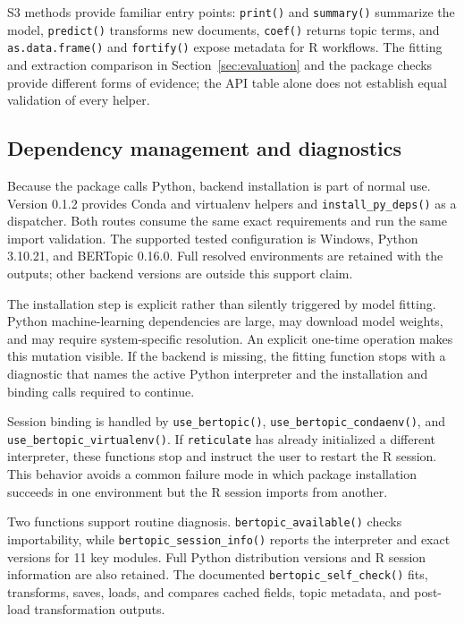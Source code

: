 \documentclass[12pt]{article}
\newcommand{\pkg}[1]{\texttt{#1}}
\newcommand{\code}[1]{\texttt{#1}}
\begin{document}
S3 methods provide familiar entry points: \code{print()} and \code{summary()} summarize the model, \code{predict()} transforms new documents, \code{coef()} returns topic terms, and \code{as.data.frame()} and \code{fortify()} expose metadata for R workflows. The fitting and extraction comparison in Section~\ref{sec:evaluation} and the package checks provide different forms of evidence; the API table alone does not establish equal validation of every helper.

\subsection{Dependency management and diagnostics}

Because the package calls Python, backend installation is part of normal use. Version 0.1.2 provides Conda and virtualenv helpers and \code{install\_py\_deps()} as a dispatcher. Both routes consume the same exact requirements and run the same import validation. The supported tested configuration is Windows, Python 3.10.21, and BERTopic 0.16.0. Full resolved environments are retained with the outputs; other backend versions are outside this support claim.

The installation step is explicit rather than silently triggered by model fitting. Python machine-learning dependencies are large, may download model weights, and may require system-specific resolution. An explicit one-time operation makes this mutation visible. If the backend is missing, the fitting function stops with a diagnostic that names the active Python interpreter and the installation and binding calls required to continue.

Session binding is handled by \code{use\_bertopic()}, \code{use\_bertopic\_condaenv()}, and \code{use\_bertopic\_virtualenv()}. If \pkg{reticulate} has already initialized a different interpreter, these functions stop and instruct the user to restart the R session. This behavior avoids a common failure mode in which package installation succeeds in one environment but the R session imports from another.

Two functions support routine diagnosis. \code{bertopic\_available()} checks importability, while \code{bertopic\_session\_info()} reports the interpreter and exact versions for 11 key modules. Full Python distribution versions and R session information are also retained. The documented \code{bertopic\_self\_check()} fits, transforms, saves, loads, and compares cached fields, topic metadata, and post-load transformation outputs.
\end{document}

